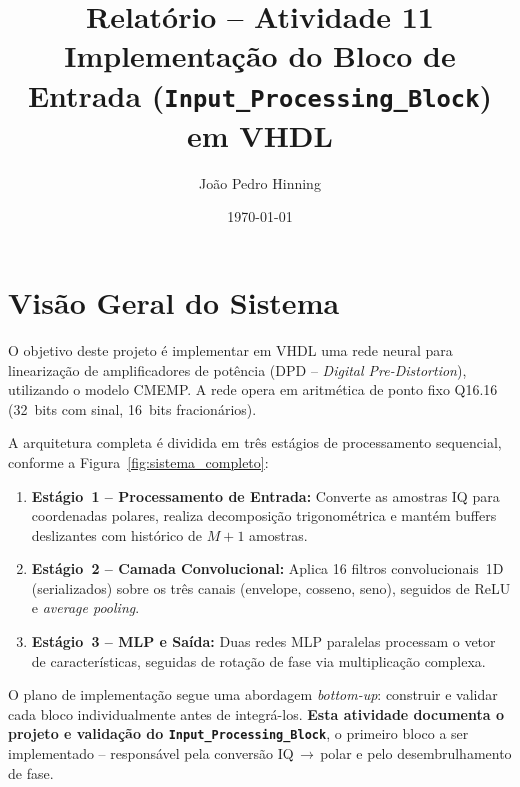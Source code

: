 \documentclass[a4paper,12pt]{article}
\title{Relat\'orio -- Atividade 11 \\
       \large Implementa\c{c}\~ao do Bloco de Entrada (\texttt{Input\_Processing\_Block}) em VHDL}
\author{Jo\~ao Pedro Hinning}
\date{\today}
\begin{document}
\maketitle
\thispagestyle{fancy}

\section{Vis\~ao Geral do Sistema}

O objetivo deste projeto \'e implementar em VHDL uma rede neural para lineariza\c{c}\~ao de amplificadores de pot\^encia (DPD -- \textit{Digital Pre-Distortion}), utilizando o modelo CMEMP. A rede opera em aritm\'etica de ponto fixo Q16.16 (32~bits com sinal, 16~bits fracion\'arios).

A arquitetura completa \'e dividida em tr\^es est\'agios de processamento sequencial, conforme a Figura~\ref{fig:sistema_completo}:
\begin{enumerate}
    \item \textbf{Est\'agio~1 -- Processamento de Entrada:} Converte as amostras IQ para coordenadas polares, realiza decomposi\c{c}\~ao trigonom\'etrica e mant\'em buffers deslizantes com hist\'orico de $M+1$ amostras.
    \item \textbf{Est\'agio~2 -- Camada Convolucional:} Aplica 16 filtros convolucionais~1D (serializados) sobre os tr\^es canais (envelope, cosseno, seno), seguidos de ReLU e \textit{average pooling}.
    \item \textbf{Est\'agio~3 -- MLP e Sa\'ida:} Duas redes MLP paralelas processam o vetor de caracter\'isticas, seguidas de rota\c{c}\~ao de fase via multiplica\c{c}\~ao complexa.
\end{enumerate}

O plano de implementa\c{c}\~ao segue uma abordagem \textit{bottom-up}: construir e validar cada bloco individualmente antes de integr\'a-los. \textbf{Esta atividade documenta o projeto e valida\c{c}\~ao do \texttt{Input\_Processing\_Block}}, o primeiro bloco a ser implementado -- respons\'avel pela convers\~ao IQ$\,\rightarrow\,$polar e pelo desembrulhamento de fase.
\end{document}
